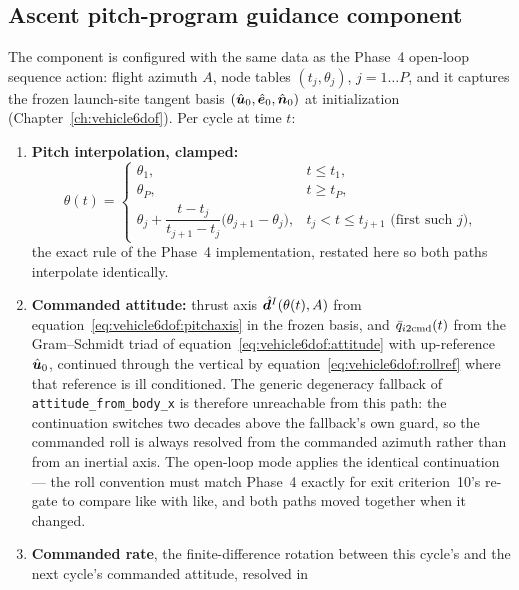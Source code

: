 \subsection{Ascent pitch-program guidance component}
\label{sec:gnc:ascent}

The component is configured with the same data as the Phase~4 open-loop
sequence action: flight azimuth $A$, node tables $(t_j, \theta_j)$,
$j = 1 \dots P$, and it captures the frozen launch-site tangent basis
$(\hat{\bm{u}}_0, \hat{\bm{e}}_0, \hat{\bm{n}}_0)$ at initialization
(Chapter~\ref{ch:vehicle6dof}). Per cycle at time $t$:
\begin{enumerate}
  \item \textbf{Pitch interpolation, clamped:}
    \begin{equation}
      \theta(t) =
      \begin{cases}
        \theta_1, & t \le t_1,\\
        \theta_P, & t \ge t_P,\\
        \theta_j + \dfrac{t - t_j}{t_{j+1} - t_j}
          \bigl(\theta_{j+1} - \theta_j\bigr),
          & t_j < t \le t_{j+1} \text{ (first such } j\text{)},
      \end{cases}
      \label{eq:gnc:interp}
    \end{equation}
    the exact rule of the Phase~4 implementation, restated here so both
    paths interpolate identically.
  \item \textbf{Commanded attitude:} thrust axis
    $\hat{\bm{d}}^{I}(\theta(t), A)$ from
    equation~\eqref{eq:vehicle6dof:pitchaxis} in the frozen basis, and
    $\bar{q}_{i2\mathrm{cmd}}(t)$ from the Gram--Schmidt triad of
    equation~\eqref{eq:vehicle6dof:attitude} with up-reference
    $\hat{\bm{u}}_0$, continued through the vertical by
    equation~\eqref{eq:vehicle6dof:rollref} where that reference is
    ill conditioned. The generic degeneracy fallback of
    \texttt{attitude\_from\_body\_x} is therefore unreachable from this
    path: the continuation switches two decades above the fallback's
    own guard, so the commanded roll is always resolved from the
    commanded azimuth rather than from an inertial axis. The open-loop
    mode applies the identical continuation --- the roll convention must
    match Phase~4 exactly for exit criterion~10's re-gate to compare
    like with like, and both paths moved together when it changed.
  \item \textbf{Commanded rate}, the finite-difference rotation between
    this cycle's and the next cycle's commanded attitude, resolved in

\end{enumerate}
